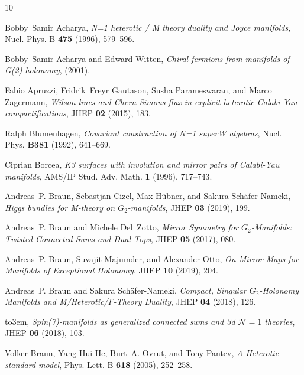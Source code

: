 \documentclass{pspum-l}
\theoremstyle{definition}
\theoremstyle{remark}
\numberwithin{equation}{section}
\begin{document}
\providecommand{\bysame}{\leavevmode\hbox to3em{\hrulefill}\thinspace}
\providecommand{\MR}{\relax\ifhmode\unskip\space\fi MR }
\providecommand{\MRhref}[2]{%
  \href{http://www.ams.org/mathscinet-getitem?mr=#1}{#2}
}
\providecommand{\href}[2]{#2}
\begin{thebibliography}{10}

Bobby~Samir Acharya, \emph{{N=1 heterotic / M theory duality and Joyce
  manifolds}}, Nucl. Phys. B \textbf{475} (1996), 579--596.

Bobby~Samir Acharya and Edward Witten, \emph{{Chiral fermions from manifolds of
  G(2) holonomy}},  (2001).

Fabio Apruzzi, Fridrik~Freyr Gautason, Susha Parameswaran, and Marco Zagermann,
  \emph{{Wilson lines and Chern-Simons flux in explicit heterotic Calabi-Yau
  compactifications}}, JHEP \textbf{02} (2015), 183.

Ralph Blumenhagen, \emph{{Covariant construction of N=1 superW algebras}},
  Nucl. Phys. \textbf{B381} (1992), 641--669.

Ciprian Borcea, \emph{{K3 surfaces with involution and mirror pairs of
  Calabi-Yau manifolds}}, AMS/IP Stud. Adv. Math. \textbf{1} (1996), 717--743.

Andreas~P. Braun, Sebastjan Cizel, Max Hübner, and Sakura Schäfer-Nameki,
  \emph{{Higgs bundles for M-theory on $G_{2}$-manifolds}}, JHEP \textbf{03}
  (2019), 199.

Andreas~P. Braun and Michele Del~Zotto, \emph{{Mirror Symmetry for
  $G_2$-Manifolds: Twisted Connected Sums and Dual Tops}}, JHEP \textbf{05}
  (2017), 080.

Andreas~P. Braun, Suvajit Majumder, and Alexander Otto, \emph{{On Mirror Maps
  for Manifolds of Exceptional Holonomy}}, JHEP \textbf{10} (2019), 204.

Andreas~P. Braun and Sakura Sch\"afer-Nameki, \emph{{Compact, Singular
  $G_2$-Holonomy Manifolds and M/Heterotic/F-Theory Duality}}, JHEP \textbf{04}
  (2018), 126.

\bysame, \emph{{Spin(7)-manifolds as generalized connected sums and 3d
  $\mathcal{N}=1$ theories}}, JHEP \textbf{06} (2018), 103.

Volker Braun, Yang-Hui He, Burt~A. Ovrut, and Tony Pantev, \emph{{A Heterotic
  standard model}}, Phys. Lett. B \textbf{618} (2005), 252--258.


\end{thebibliography}
\end{document}
